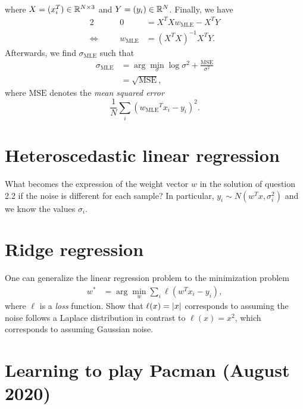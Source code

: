 \documentclass[11pt, a4paper]{article}
\begin{document}
\begin{enumerate}
\begin{solution}
\begin{align*}
        \end{align*}
        where $X = (x_i^T) \in \mathbb{R}^{N \times 3}$ and $Y = (y_i) \in \mathbb{R}^{N}$. Finally, we have
        \begin{alignat*}{2}
            && 0 & = X^T X w_{\text{MLE}} - X^T Y \\
            \Leftrightarrow \quad && w_{\text{MLE}} & = (X^T X)^{-1} X^T Y .
        \end{alignat*}
        Afterwards, we find $\sigma_{\text{MLE}}$ such that
        \begin{align*}
            \sigma_{\text{MLE}} & = \arg \min_\sigma \log \sigma^2 + \frac{\text{MSE}}{\sigma^2} \\
            & = \sqrt{\text{MSE}},
        \end{align*}
        where $\text{MSE}$ denotes the \emph{mean squared error}
        \begin{equation*}
            \frac{1}{N} \sum_i ({w_{\text{MLE}}}^T x_i - y_i)^2 .
        \end{equation*}
    \end{solution}
\end{enumerate}

\newpage

\section{Heteroscedastic linear regression}

What becomes the expression of the weight vector $w$ in the solution of question 2.2 if the noise is different for each sample? In
particular, $y_i \sim N(w^T x, \sigma_i^2)$ and we know the values $\sigma_i$.

\newpage

\section{Ridge regression}

One can generalize the linear regression problem to the minimization problem
\begin{align*}
    w^* & = \arg \min_w \sum_i \ell(w^T x_i - y_i) ,
\end{align*}
where $\ell$ is a \emph{loss} function. Show that $\ell(x) = \lvert x\rvert$ corresponds to assuming the noise follows a Laplace distribution in contrast to $\ell(x) = x^2$, which corresponds to assuming Gaussian noise.

\newpage

\section{Learning to play Pacman (August 2020)}
\end{document}
